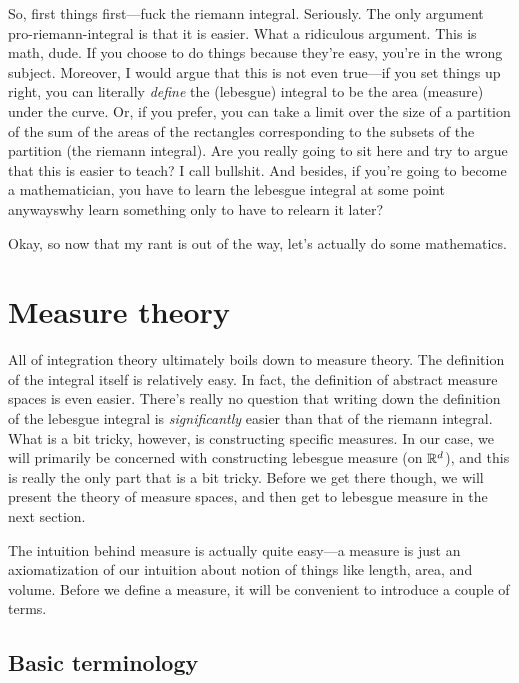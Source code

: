 So, first things first---fuck the riemann integral.  Seriously.  The only argument pro-riemann-integral is that it is easier.  What a ridiculous argument.  This is math, dude.  If you choose to do things because they're easy, you're in the wrong subject.  Moreover, I would argue that this is not even true---if you set things up right, you can literally \emph{define} the (lebesgue) integral to be the area (measure) under the curve.  Or, if you prefer, you can take a limit over the size of a partition of the sum of the areas of the rectangles corresponding to the subsets of the partition (the riemann integral).  Are you really going to sit here and try to argue that this is easier to teach?  I call bullshit.  And besides, if you're going to become a mathematician, you have to learn the lebesgue integral at some point anyways\textellipsis why learn something only to have to relearn it later?

Okay, so now that my rant is out of the way, let's actually do some mathematics.

\section{Measure theory}

All of integration theory ultimately boils down to measure theory.  The definition of the integral itself is relatively easy.  In fact, the definition of abstract measure spaces is even easier.  There's really no question that writing down the definition of the lebesgue integral is \emph{significantly} easier than that of the riemann integral.  What is a bit tricky, however, is constructing specific measures.  In our case, we will primarily be concerned with constructing lebesgue measure (on $\mathbb{R} ^d$), and this is really the only part that is a bit tricky.  Before we get there though, we will present the theory of measure spaces, and then get to lebesgue measure in the next section.

The intuition behind measure is actually quite easy---a measure is just an axiomatization of our intuition about notion of things like length, area, and volume.  Before we define a measure, it will be convenient to introduce a couple of terms.

\subsection{Basic terminology}

